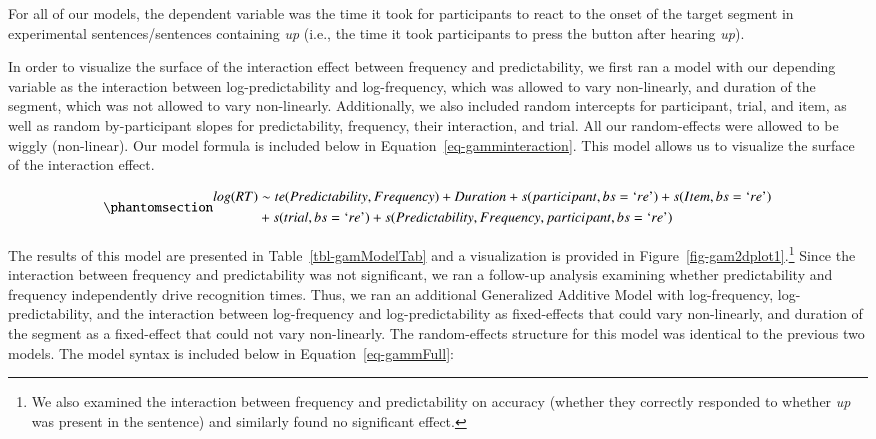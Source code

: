 \documentclass[
  authoryear,
  preprint,
  1p,
  onecolumn]{elsarticle}
\begin{document}
For all of our models, the dependent variable was the time it took for
participants to react to the onset of the target segment in experimental
sentences/sentences containing \emph{up} (i.e., the time it took
participants to press the button after hearing \emph{up}).

In order to visualize the surface of the interaction effect between
frequency and predictability, we first ran a model with our depending
variable as the interaction between log-predictability and
log-frequency, which was allowed to vary non-linearly, and duration of
the segment, which was not allowed to vary non-linearly. Additionally,
we also included random intercepts for participant, trial, and item, as
well as random by-participant slopes for predictability, frequency,
their interaction, and trial. All our random-effects were allowed to be
wiggly (non-linear). Our model formula is included below in
Equation~\ref{eq-gamminteraction}. This model allows us to visualize the
surface of the interaction effect.

\begin{equation}\phantomsection\label{eq-gamminteraction}{
\begin{aligned}log(RT) & \sim te(Predictability, Frequency) + Duration + s(participant, bs = \text{`}re\text{'}) + s(Item, bs = \text{`}re\text{'}) \\& + s(trial, bs = \text{`}re\text{'}) + s(Predictability, Frequency, participant, bs = \text{`}re\text{'}) \end{aligned}
}\end{equation}

The results of this model are presented in Table~\ref{tbl-gamModelTab}
and a visualization is provided in
Figure~\ref{fig-gam2dplot1}.\footnote{We also examined the interaction
  between frequency and predictability on accuracy (whether they
  correctly responded to whether \emph{up} was present in the sentence)
  and similarly found no significant effect.} Since the interaction
between frequency and predictability was not significant, we ran a
follow-up analysis examining whether predictability and frequency
independently drive recognition times. Thus, we ran an additional
Generalized Additive Model with log-frequency, log-predictability, and
the interaction between log-frequency and log-predictability as
fixed-effects that could vary non-linearly, and duration of the segment
as a fixed-effect that could not vary non-linearly. The random-effects
structure for this model was identical to the previous two models. The
model syntax is included below in Equation~\ref{eq-gammFull}:
\end{document}
